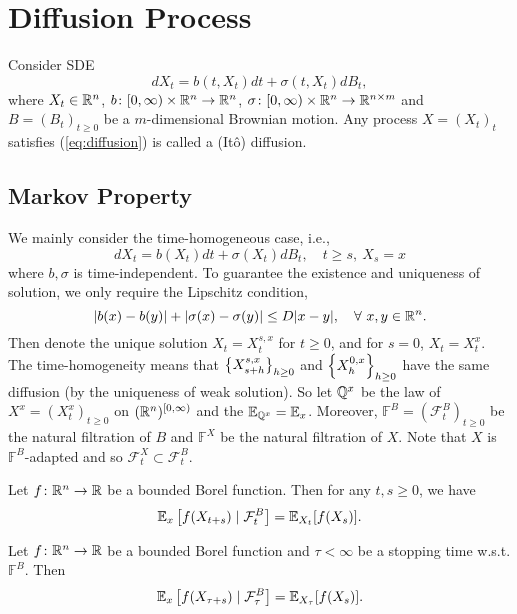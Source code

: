 \chapter{Diffusion Process}

Consider SDE
\begin{equation}\label{eq:diffusion}
    dX_t = b(t,X_t)dt + \sigma(t,X_t)dB_t,
\end{equation}
where $X_t \in \mathbb{R}^n$, $b\colon [0,\infty) \times\mathbb{R}^{n} \rightarrow \mathbb{R}^n$, $\sigma \colon [0,\infty) \times\mathbb{R}^{n} \rightarrow \mathbb{R}^{n\times m}$ and $B = (B_t)_{t \geq 0}$ be a $m$-dimensional Brownian motion. Any process $X = (X_t)_{t}$ satisfies (\ref{eq:diffusion}) is called a (It\^o) diffusion.

\section{Markov Property}

We mainly consider the time-homogeneous case, i.e.,
\begin{equation*}
	dX_t = b(X_t)dt + \sigma(X_t)dB_t, \quad t \geq s,~X_s = x
\end{equation*}
where $b,\sigma$ is time-independent. To guarantee the existence and uniqueness of solution, we only require the Lipschitz condition,
\begin{equation*}
	|b(x)-b(y)|+|\sigma(x)-\sigma(y)| \leq D|x-y|,\quad \forall~ x,y \in \mathbb{R}^n.
\end{equation*}
Then denote the unique solution $X_t = X_t^{s,x}$ for $t \geq 0$, and for $s = 0$, $X_t = X^x_t$. The time-homogeneity means that $\left\{X^{s,x}_{s+h}\right\}_{h \geq 0}$ and $\left\{X^{0,x}_h\right\}_{h \geq 0}$ have the same diffusion (by the uniqueness of weak solution). So let $\mathbb{Q}^x$ be the law of $X^x=(X_t^x)_{t \geq 0}$ on $(\mathbb{R}^n)^{[0,\infty)}$ and the $\mathbb{E}_{\mathbb{Q}^x} = \mathbb{E}_x$. Moreover, $\mathbb{F}^B = (\mathcal{F}^B_t)_{t\geq 0}$ be the natural filtration of $B$ and $\mathbb{F}^X$ be the natural filtration of $X$. Note that $X$ is $\mathbb{F}^B$-adapted and so $\mathcal{F}_t^X \subset \mathcal{F}^B_t$.

\begin{thm}
    Let $f \colon \mathbb{R}^n \rightarrow \mathbb{R}$ be a bounded Borel function. Then for any $t,s \geq 0$, we have
    \begin{equation*}
    	\mathbb{E}_x\left[f(X_{t+s}) \mid \mathcal{F}^B_t\right] = \mathbb{E}_{X_t}[f(X_s)].
    \end{equation*}
\end{thm}

\begin{thm}
    Let $f \colon \mathbb{R}^n \rightarrow \mathbb{R}$ be a bounded Borel function and $\tau < \infty$ be a stopping time w.s.t. $\mathbb{F}^B$. Then
    \begin{equation*}
    	\mathbb{E}_x\left[f(X_{\tau+s}) \mid \mathcal{F}^B_\tau\right] = \mathbb{E}_{X_\tau}[f(X_s)].
    \end{equation*}
\end{thm}


